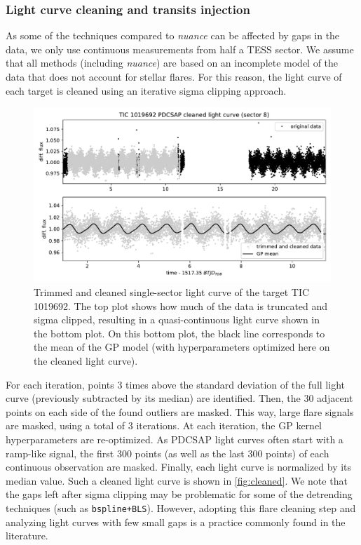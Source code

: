 \documentclass[modern]{aastex631}
\newcommand{\nuancemethod}{\textit{nuance}}
\newcommand{\nuance}{\nuancemethod{}}
\begin{document}
\subsubsection*{Light curve cleaning and transits injection}
As some of the techniques compared to \nuance{} can be affected by gaps in the data, we only use continuous measurements from half a TESS sector. We assume that all methods (including \nuance{}) are based on an incomplete model of the data that does not account for stellar flares. For this reason, the light curve of each target is cleaned using an iterative sigma clipping approach.
\begin{figure}[H]
    \centering
    \includegraphics[width=\linewidth]{../workflows/tess_injection_recovery/figures/cleaned/1019692.pdf}
    \caption{Trimmed and cleaned single-sector light curve of the target TIC 1019692. The top plot shows how much of the data is truncated and sigma clipped, resulting in a quasi-continuous light curve shown in the bottom plot. On this bottom plot, the black line corresponds to the mean of the GP model (with hyperparameters optimized here on the cleaned light curve).}
    \label{fig:cleaned}
\end{figure}
For each iteration, points 3 times above the standard deviation of the full light curve (previously subtracted by its median) are identified. Then, the 30 adjacent points on each side of the found outliers are masked. This way, large flare signals are masked, using a total of 3 iterations. At each iteration, the GP kernel hyperparameters are re-optimized. As PDCSAP light curves often start with a ramp-like signal, the first 300 points (as well as the last 300 points) of each continuous observation are masked. Finally, each light curve is normalized by its median value. Such a cleaned light curve is shown in \autoref{fig:cleaned}. We note that the gaps left after sigma clipping may be problematic for some of the detrending techniques (such as \texttt{bspline+BLS}). However, adopting this flare cleaning step and analyzing light curves with few small gaps is a practice commonly found in the literature.\\\\
\end{document}
